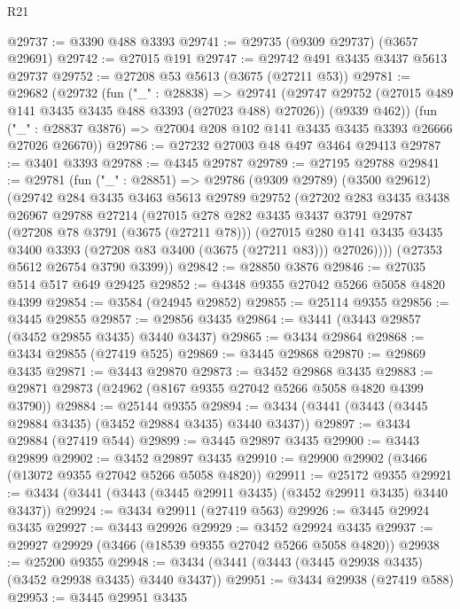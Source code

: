 \begin{lexlean}{R21}
\begin{coremodule}
@29737 := @3390 @488 @3393
@29741 := @29735 (@9309 @29737) (@3657 @29691)
@29742 := @27015 @191
@29747 := @29742 @491 @3435 @3437 @5613 @29737
@29752 := @27208 @53 @5613 (@3675 (@27211 @53))
@29781 := @29682
    (@29732
      (fun ("_" : @28838) =>
      @29741
        (@29747 @29752 (@27015 @489 @141 @3435 @3435 @488 @3393 (@27023 @488) @27026))
        (@9339 @462))
      (fun ("_" : @28837 @3876) => @27004 @208 @102 @141 @3435 @3435 @3393 @26666 @27026 @26670))
@29786 := @27232 @27003 @48 @497 @3464 @29413
@29787 := @3401 @3393
@29788 := @4345 @29787
@29789 := @27195 @29788
@29841 := @29781
    (fun ("_" : @28851) =>
    @29786
      (@9309 @29789)
      (@3500 @29612)
      (@29742
        @284
        @3435
        @3463
        @5613
        @29789
        @29752
        (@27202
          @283
          @3435
          @3438
          @26967
          @29788
          @27214
          (@27015
            @278
            @282
            @3435
            @3437
            @3791
            @29787
            (@27208 @78 @3791 (@3675 (@27211 @78)))
            (@27015
              @280
              @141
              @3435
              @3435
              @3400
              @3393
              (@27208 @83 @3400 (@3675 (@27211 @83)))
              @27026))))
      (@27353 @5612 @26754 @3790 @3399))
@29842 := @28850 @3876
@29846 := @27035 @514 @517 @649 @29425
@29852 := @4348 @9355 @27042 @5266 @5058 @4820 @4399
@29854 := @3584 (@24945 @29852)
@29855 := @25114 @9355
@29856 := @3445 @29855
@29857 := @29856 @3435
@29864 := @3441 (@3443 @29857 (@3452 @29855 @3435) @3440 @3437)
@29865 := @3434 @29864
@29868 := @3434 @29855 (@27419 @525)
@29869 := @3445 @29868
@29870 := @29869 @3435
@29871 := @3443 @29870
@29873 := @3452 @29868 @3435
@29883 := @29871 @29873 (@24962 (@8167 @9355 @27042 @5266 @5058 @4820 @4399 @3790))
@29884 := @25144 @9355
@29894 := @3434 (@3441 (@3443 (@3445 @29884 @3435) (@3452 @29884 @3435) @3440 @3437))
@29897 := @3434 @29884 (@27419 @544)
@29899 := @3445 @29897 @3435
@29900 := @3443 @29899
@29902 := @3452 @29897 @3435
@29910 := @29900 @29902 (@3466 (@13072 @9355 @27042 @5266 @5058 @4820))
@29911 := @25172 @9355
@29921 := @3434 (@3441 (@3443 (@3445 @29911 @3435) (@3452 @29911 @3435) @3440 @3437))
@29924 := @3434 @29911 (@27419 @563)
@29926 := @3445 @29924 @3435
@29927 := @3443 @29926
@29929 := @3452 @29924 @3435
@29937 := @29927 @29929 (@3466 (@18539 @9355 @27042 @5266 @5058 @4820))
@29938 := @25200 @9355
@29948 := @3434 (@3441 (@3443 (@3445 @29938 @3435) (@3452 @29938 @3435) @3440 @3437))
@29951 := @3434 @29938 (@27419 @588)
@29953 := @3445 @29951 @3435

\end{coremodule}
\end{lexlean}
